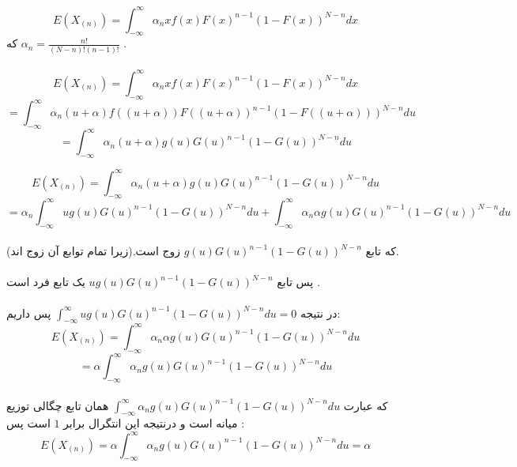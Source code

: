 \parte{}
\[
    E(X_{(n)}) = \int_{-\infty}^{\infty}
    {\alpha_n x f(x)F(x)^{n-1}(1-F(x))^{N-n}}dx
\]
که $\alpha_n = \frac{n!}{(N-n)!(n-1)!}$
.\\\\
\parte{}
\[
    E(X_{(n)}) = \int_{-\infty}^{\infty}
    {\alpha_n x f(x)F(x)^{n-1}(1-F(x))^{N-n}}dx
\]
\[
    = \int_{-\infty}^{\infty}
    {\alpha_n (u+\alpha) f((u+\alpha))F((u+\alpha))^{n-1}(1-F((u+\alpha)))^{N-n}}du
\]
\[
    = \int_{-\infty}^{\infty}
    {\alpha_n (u+\alpha) g(u)G(u)^{n-1}(1-G(u))^{N-n}}du
\]

\parte{}

\[
    E(X_{(n)}) = \int_{-\infty}^{\infty}
    {\alpha_n (u+\alpha) g(u)G(u)^{n-1}(1-G(u))^{N-n}}du
\]
\[
    = \alpha_n  \int_{-\infty}^{\infty}
    {u g(u)G(u)^{n-1}(1-G(u))^{N-n}}du
    +
    \int_{-\infty}^{\infty}
    {\alpha_n \alpha g(u)G(u)^{n-1}(1-G(u))^{N-n}}du
\]\\

که تابع $g(u)G(u)^{n-1}(1-G(u))^{N-n}$
زوج است.(زیرا تمام توابع آن زوج اند).\\\\
پس تابع $ug(u)G(u)^{n-1}(1-G(u))^{N-n}$
یک تابع فرد است .\\\\
در نتیجه 
$\int_{-\infty}^{\infty}
{u g(u)G(u)^{n-1}(1-G(u))^{N-n}}du = 0$
پس داریم:\\

\[
    E(X_{(n)}) = \int_{-\infty}^{\infty}
    {\alpha_n \alpha g(u)G(u)^{n-1}(1-G(u))^{N-n}}du
\]
\[
    = \alpha \int_{-\infty}^{\infty}
    {\alpha_ng(u)G(u)^{n-1}(1-G(u))^{N-n}}du
\]\\
که عبارت $\int_{-\infty}^{\infty}
{\alpha_ng(u)G(u)^{n-1}(1-G(u))^{N-n}}du$
همان تابع چگالی توزیع میانه است و درنتیجه این انتگرال برابر 
$1$ است پس :\\
\[
    E(X_{(n)}) = \alpha \int_{-\infty}^{\infty}
    {\alpha_ng(u)G(u)^{n-1}(1-G(u))^{N-n}}du = 
    \alpha
\]\\